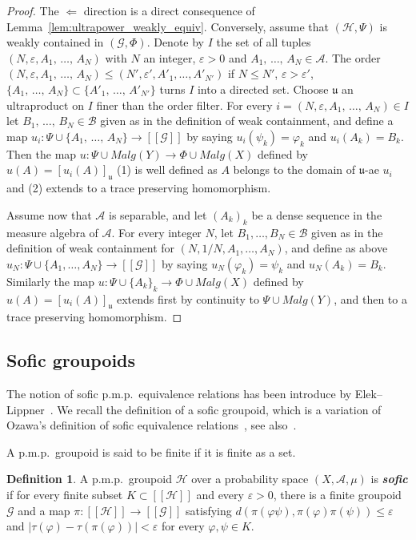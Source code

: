 \documentclass[10pt]{amsart}
\theoremstyle{definition}
\newtheorem{defi}[cdrthm]{Definition}
\newcommand{\defin}[1]{\textbf{\emph{#1}}}
\newcommand{\cH}{\mathcal{H}}
\newcommand{\ch}{\mathcal{H}}
\newcommand{\cg}{\mathcal{G}}
\newcommand{\ra}{\mathscr{A}}
\newcommand{\rb}{\mathscr{B}}
\newcommand{\ul}{\mathfrak{u}}
\newcommand{\eps}{\varepsilon}
\newcommand{\ph}{\varphi}
\newcommand{\pmp}{p.m.p.\ }
\begin{document}
\begin{proof}
The $\Leftarrow$ direction is a direct consequence of Lemma~\ref{lem:ultrapower_weakly_equiv}. Conversely, assume that $(\cH,\Psi)$ is weakly contained in $(\cg,\Phi)$. Denote by $I$ the set of all tuples $(N,\varepsilon,A_1,\,\dots,\,A_N)$ with $N$ an integer, $\varepsilon>0$ and $A_1,\,\dots,\,A_N \in \ra$. The order $(N,\varepsilon,A_1,\,\dots,\,A_N)\leq (N',\varepsilon',A'_1,\dots,A'_{N'})$ if $N \leq N'$, $\varepsilon>\varepsilon'$, $\{A_1,\,\dots,\,A_N\} \subset \{A'_1,\,\dots,\,A'_{N'}\}$ turns $I$ into a directed set. Choose $\ul$ an ultraproduct on $I$ finer than the order filter. For every $i=(N,\varepsilon,A_1,\,\dots,\,A_N) \in I$ let $B_1,\,\dots,\,B_N \in \rb$ given as in the definition of weak containment, and define a map $u_i\colon \Psi \cup \{A_1,\,\dots,\,A_N\} \to [[\cg]]$ by saying $u_i(\psi_k)=\ph_k$ and $u_i(A_k)=B_k$. Then the map $u\colon \Psi \cup Malg(Y)\to \Phi \cup Malg(X)$ defined by $u(A) = [u_i(A)]_\ul$ (1) is well defined as $A$ belongs to the domain of $\ul$-ae $u_i$ and (2) extends to a trace preserving homomorphism.

Assume now that $\ra$ is separable, and let $(A_k)_k$ be a dense sequence in the measure algebra of $\ra$. For every integer $N$, let $B_1,\dots,B_N \in \rb$ given as in the definition of weak containment for $(N,1/N,A_1,\dots,A_N)$, and define as above $u_N\colon \Psi \cup \{A_1,\dots,A_N\} \to [[\cg]]$ by saying $u_N(\ph_k)=\psi_k$ and $u_N(A_k)=B_k$. Similarly the map $u\colon \Psi \cup \{A_k\}_k\to \Phi \cup Malg(X)$ defined by $u(A) = [u_i(A)]_\ul$ extends first by continuity to $\Psi \cup Malg(Y)$, and then to a trace preserving homomorphism.
\end{proof}

\subsection{Sofic groupoids}\label{sect: sofic groupoids}
The notion of sofic \pmp equivalence relations has been introduce by Elek--Lippner~\cite{Elek-Lippner-2010}. We recall the definition of a sofic groupoid, which is a variation of Ozawa's definition of sofic equivalence relations~\cite{Ozawa-hyp-sofic}, see also~\cite{Cordeiro-2017}.


A \pmp groupoid is said to be finite if it is finite as a set.

\begin{defi}\label{def:sofic_groupoid}
A \pmp groupoid $\ch$ over a probability space $(X,\ra,\mu)$ is
\defin{sofic} if for every finite subset $K \subset [[\ch]]$ and every $\varepsilon>0$, there is a finite groupoid $\cg$ and a map $\pi \colon [[\ch]] \to [[\cg]]$ satisfying $d(\pi(\ph\psi),\pi(\ph)\pi(\psi)) \leq \eps$ and $|\tau(\ph) - \tau(\pi(\ph))|<\eps$ for every $\ph,\psi \in K$.
\end{defi}
\end{document}
